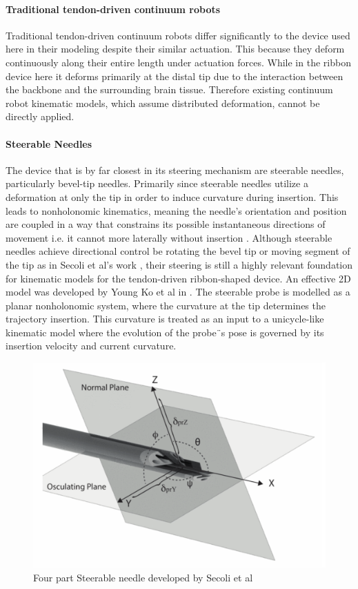 \paragraph*{Traditional tendon-driven continuum robots}
Traditional tendon-driven continuum robots differ significantly to the device used here in their modeling despite their similar actuation. This because they deform continuously along their entire length under actuation forces. While in the ribbon device here it deforms primarily at the distal tip due to the interaction between the backbone and the surrounding brain tissue. Therefore existing continuum robot kinematic models, which assume distributed deformation, cannot be directly applied.

\paragraph*{Steerable Needles}
The device that is by far closest in its steering mechanism are steerable needles, particularly bevel-tip needles. Primarily since steerable needles utilize a deformation at only the tip in order to induce curvature during insertion. This leads to nonholonomic kinematics, meaning the needle's orientation and position are coupled in a way that constrains its possible instantaneous directions of movement i.e. it cannot more laterally without insertion \cite{webster_nonholonomic_2006}. Although steerable needles achieve directional control be rotating the bevel tip or moving segment of the tip as in Secoli et al's work \cite{secoli_adaptive_2016} \cite{secoli_closed-loop_2013}, their steering is still a highly relevant foundation for kinematic models for the tendon-driven ribbon-shaped device.
\newline \newline 
An effective 2D model was developed by Young Ko et al in \cite{ko_two-dimensional_2010}. The steerable probe is modelled as a planar nonholonomic system, where the curvature at the tip determines the trajectory insertion. This curvature is treated as an input to a unicycle-like kinematic model where the evolution of the probe¨s pose is governed by its insertion velocity and current curvature.
\begin{figure} [H]
    \centering
    \includegraphics[width=0.7\linewidth]{images/steerableNeedles/needlefig.png}
    \caption{Four part Steerable needle developed by Secoli et al \cite{secoli_closed-loop_2013}}
    \label{fig:fourpartneedle}
\end{figure}
